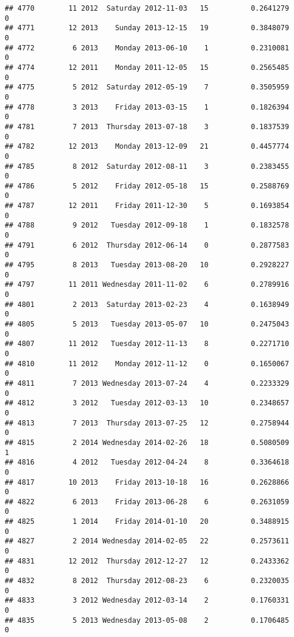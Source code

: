 \documentclass[
]{article}
\begin{document}
\begin{verbatim}
## 4770        11 2012  Saturday 2012-11-03   15          0.2641279             0
## 4771        12 2013    Sunday 2013-12-15   19          0.3848079             0
## 4772         6 2013    Monday 2013-06-10    1          0.2310081             0
## 4774        12 2011    Monday 2011-12-05   15          0.2565485             0
## 4775         5 2012  Saturday 2012-05-19    7          0.3505959             0
## 4778         3 2013    Friday 2013-03-15    1          0.1826394             0
## 4781         7 2013  Thursday 2013-07-18    3          0.1837539             0
## 4782        12 2013    Monday 2013-12-09   21          0.4457774             0
## 4785         8 2012  Saturday 2012-08-11    3          0.2383455             0
## 4786         5 2012    Friday 2012-05-18   15          0.2588769             0
## 4787        12 2011    Friday 2011-12-30    5          0.1693854             0
## 4788         9 2012   Tuesday 2012-09-18    1          0.1832578             0
## 4791         6 2012  Thursday 2012-06-14    0          0.2877583             0
## 4795         8 2013   Tuesday 2013-08-20   10          0.2928227             0
## 4797        11 2011 Wednesday 2011-11-02    6          0.2789916             0
## 4801         2 2013  Saturday 2013-02-23    4          0.1638949             0
## 4805         5 2013   Tuesday 2013-05-07   10          0.2475043             0
## 4807        11 2012   Tuesday 2012-11-13    8          0.2271710             0
## 4810        11 2012    Monday 2012-11-12    0          0.1650067             0
## 4811         7 2013 Wednesday 2013-07-24    4          0.2233329             0
## 4812         3 2012   Tuesday 2012-03-13   10          0.2348657             0
## 4813         7 2013  Thursday 2013-07-25   12          0.2758944             0
## 4815         2 2014 Wednesday 2014-02-26   18          0.5080509             1
## 4816         4 2012   Tuesday 2012-04-24    8          0.3364618             0
## 4817        10 2013    Friday 2013-10-18   16          0.2628866             0
## 4822         6 2013    Friday 2013-06-28    6          0.2631059             0
## 4825         1 2014    Friday 2014-01-10   20          0.3488915             0
## 4827         2 2014 Wednesday 2014-02-05   22          0.2573611             0
## 4831        12 2012  Thursday 2012-12-27   12          0.2433362             0
## 4832         8 2012  Thursday 2012-08-23    6          0.2320035             0
## 4833         3 2012 Wednesday 2012-03-14    2          0.1760331             0
## 4835         5 2013 Wednesday 2013-05-08    2          0.1706485             0

\end{verbatim}
\end{document}
